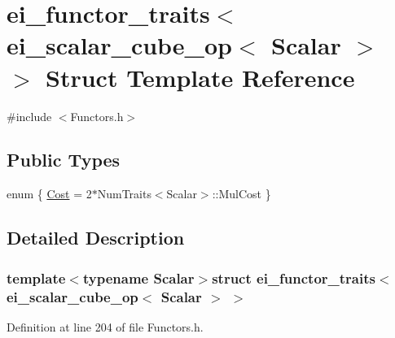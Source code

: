 \hypertarget{structei__functor__traits_3_01ei__scalar__cube__op_3_01_scalar_01_4_01_4}{\section{ei\-\_\-functor\-\_\-traits$<$ ei\-\_\-scalar\-\_\-cube\-\_\-op$<$ Scalar $>$ $>$ Struct Template Reference}
\label{structei__functor__traits_3_01ei__scalar__cube__op_3_01_scalar_01_4_01_4}
}


{\ttfamily \#include $<$Functors.\-h$>$}

\subsection*{Public Types}
\begin{DoxyCompactItemize}
\item 
enum \{ \hyperlink{structei__functor__traits_3_01ei__scalar__cube__op_3_01_scalar_01_4_01_4_a2d1019410fc8333cb4c967141407528caa32802b5e4d59ef27fc415148d59ca02}{Cost} = 2$\ast$\-Num\-Traits$<$Scalar$>$\-:\-:Mul\-Cost
 \}
\end{DoxyCompactItemize}


\subsection{Detailed Description}
\subsubsection*{template$<$typename Scalar$>$struct ei\-\_\-functor\-\_\-traits$<$ ei\-\_\-scalar\-\_\-cube\-\_\-op$<$ Scalar $>$ $>$}



Definition at line 204 of file Functors.\-h.



